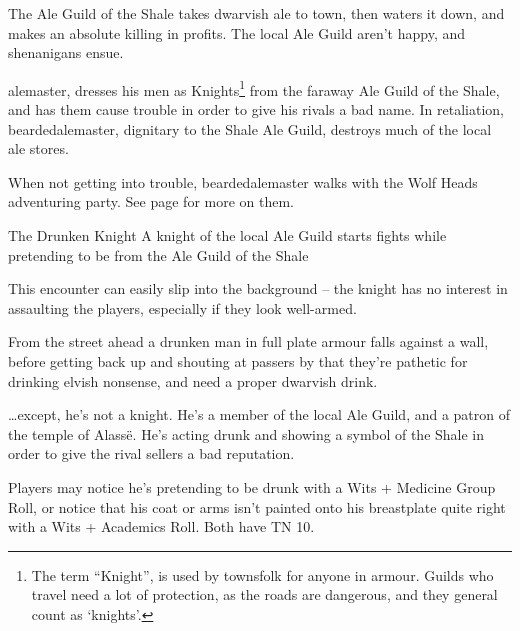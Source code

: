 \begin{multicols}{2}

\label{troubleAle}

\startcontents[sq]

\sqminitoc

\noindent
The Ale Guild of the Shale takes dwarvish ale to \gls{town}, then waters it down, and makes an absolute killing in profits.
The local Ale Guild aren't happy, and shenanigans ensue.

\Gls{alemaster}, dresses his men as Knights\footnote{The term ``Knight'', is used by townsfolk for anyone in armour.
Guilds who travel need a lot of protection, as the roads are dangerous, and they general count as `knights'.}
from the faraway Ale Guild of the Shale, and has them cause trouble in order to give his rivals a bad name.
In retaliation, \gls{beardedalemaster}, dignitary to the Shale Ale Guild, destroys much of the local ale stores.

When not getting into trouble, \Gls{beardedalemaster} walks with the Wolf Heads adventuring party.
See page \pageref{beardedalemaster} for more on them.

{The Drunken Knight}%
{A knight of the local Ale Guild starts fights while pretending to be from the Ale Guild of the Shale}%

This encounter can easily slip into the background -- the knight has no interest in assaulting the players, especially if they look well-armed.

\begin{boxtext}

	From the street ahead a drunken man in full plate armour falls against a wall, before getting back up and shouting at passers by that they're pathetic for drinking elvish nonsense, and need a proper dwarvish drink.

\end{boxtext}

\ldots except, he's not a knight.
He's a member of the local Ale Guild, and a patron of the temple of Alass\"{e}.
He's acting drunk and showing a symbol of the Shale in order to give the rival sellers a bad reputation.

Players may notice he's pretending to be drunk with a Wits + Medicine Group Roll, or notice that his coat or arms isn't painted onto his breastplate quite right with a Wits + Academics Roll.
Both have TN 10.



\end{multicols}
